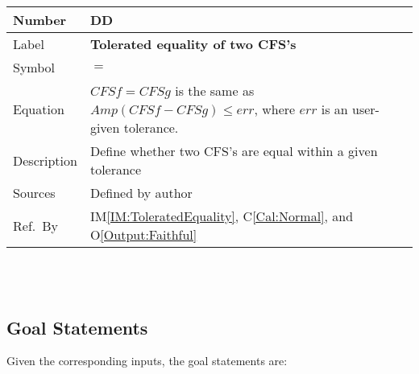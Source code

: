 \documentclass[12pt]{article}
\newcommand{\colAwidth}{0.13\textwidth}
\newcommand{\colBwidth}{0.82\textwidth}
\newcounter{defnum} %
\newcounter{datadefnum} %
\newcommand{\calref}[1]{C\ref{#1}}
\newcommand{\oref}[1]{O\ref{#1}}
\newcommand{\iref}[1]{IM\ref{#1}}
\begin{document}
\noindent
\begin{minipage}{\textwidth}
	\renewcommand*{\arraystretch}{1.5}
	\begin{tabular}{| p{\colAwidth} | p{\colBwidth}|}
		\hline
		\rowcolor[gray]{0.9}
		Number& DD{datadefnum}\thedatadefnum 
		\label{DD:Equality}\\
		\hline
		Label& \bf Tolerated equality of two CFS's\\
		\hline
		Symbol &$=$\\
		\hline
		Equation& $\mathit{CFSf}=\mathit{CFSg}$ is the same as $\mathit{Amp}
		(\mathit{CFSf}-\mathit{CFSg})\leq \mathit{err}$, 
		where $\mathit{err}$ is an user-given tolerance.\\
		\hline
		Description & Define whether two CFS's are equal within a given 
		tolerance\\
		\hline
		Sources& Defined by author\\
		\hline
		Ref.\ By & \iref{IM:ToleratedEquality}, \calref{Cal:Normal}, 
		and \oref{Output:Faithful}\\
		\hline
	\end{tabular}
\end{minipage}\\
~\newline
\subsection{Goal Statements}

\noindent Given the corresponding inputs, the goal statements are:
\end{document}

